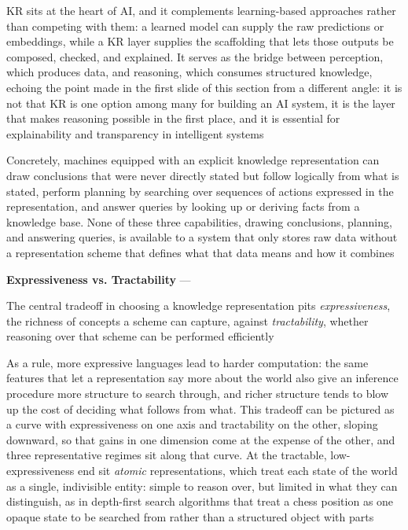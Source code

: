 KR sits at the heart of AI, and it complements learning-based approaches
rather than competing with them: a learned model can supply the raw
predictions or embeddings, while a KR layer supplies the scaffolding that
lets those outputs be composed, checked, and explained. It serves as the
bridge between perception, which produces data, and reasoning, which
consumes structured knowledge, echoing the point made in the first slide of
this section from a different angle: it is not that KR is one option among
many for building an AI system, it is the layer that makes reasoning
possible in the first place, and it is essential for explainability and
transparency in intelligent systems

Concretely, machines equipped with an explicit knowledge representation can
draw conclusions that were never directly stated but follow logically from
what is stated, perform planning by searching over sequences of actions
expressed in the representation, and answer queries by looking up or
deriving facts from a knowledge base. None of these three capabilities,
drawing conclusions, planning, and answering queries, is available to a
system that only stores raw data without a representation scheme that
defines what that data means and how it combines

\textbf{Expressiveness vs. Tractability} --- \begin{definition}
  The central tradeoff in choosing a knowledge representation pits
  \emph{expressiveness}, the richness of concepts a scheme can capture,
  against \emph{tractability}, whether reasoning over that scheme can be
  performed efficiently
\end{definition}
As a rule, more expressive languages lead to harder computation: the same
features that let a representation say more about the world also give an
inference procedure more structure to search through, and richer structure
tends to blow up the cost of deciding what follows from what. This tradeoff
can be pictured as a curve with expressiveness on one axis and tractability
on the other, sloping downward, so that gains in one dimension come at the
expense of the other, and three representative regimes sit along that
curve. At the tractable, low-expressiveness end sit \emph{atomic}
representations, which treat each state of the world as a single,
indivisible entity: simple to reason over, but limited in what they can
distinguish, as in depth-first search algorithms that treat a chess
position as one opaque state to be searched from rather than a structured
object with parts

